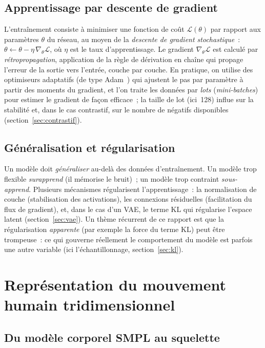\documentclass[12pt,a4paper,oneside]{report}
\theoremstyle{definition}
\theoremstyle{plain}
\begin{document}
\subsection{Apprentissage par descente de gradient}

L'entraînement consiste à minimiser une fonction de coût $\mathcal{L}(\theta)$ par
rapport aux paramètres $\theta$ du réseau, au moyen de la \emph{descente de gradient
stochastique}~: $\theta \leftarrow \theta - \eta\,\nabla_\theta\mathcal{L}$, où
$\eta$ est le taux d'apprentissage. Le gradient $\nabla_\theta\mathcal{L}$ est
calculé par \emph{rétropropagation}, application de la règle de dérivation en chaîne
qui propage l'erreur de la sortie vers l'entrée, couche par couche. En pratique, on
utilise des optimiseurs adaptatifs (de type Adam~\cite{kingma2015adam}) qui ajustent le pas par paramètre
à partir des moments du gradient, et l'on traite les données par \emph{lots}
(\emph{mini-batches}) pour estimer le gradient de façon efficace~; la taille de lot
(ici~128) influe sur la stabilité et, dans le cas contrastif, sur le nombre de
négatifs disponibles (section~\ref{sec:contrastif}).

\subsection{Généralisation et régularisation}

Un modèle doit \emph{généraliser} au-delà des données d'entraînement. Un modèle
trop flexible \emph{surapprend} (il mémorise le bruit)~; un modèle trop contraint
\emph{sous-apprend}. Plusieurs mécanismes régularisent l'apprentissage~: la
normalisation de couche (stabilisation des activations), les connexions résiduelles
(facilitation du flux de gradient), et, dans le cas d'un VAE, le terme KL qui
régularise l'espace latent (section~\ref{sec:vae}). Un thème récurrent de ce rapport
est que la régularisation \emph{apparente} (par exemple la force du terme KL) peut
être trompeuse~: ce qui gouverne réellement le comportement du modèle est parfois
une autre variable (ici l'échantillonnage, section~\ref{sec:kl}).

\section{Représentation du mouvement humain tridimensionnel}
\label{sec:motion}

\subsection{Du modèle corporel SMPL au squelette}
\end{document}
